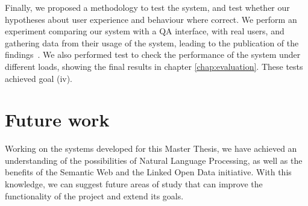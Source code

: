 Finally, we proposed a methodology to test the system, and test whether our hypotheses about user experience and behaviour where correct. We perform an experiment comparing our system with a \ac{QA} interface, with real users, and gathering data from their usage of the system, leading to the publication of the findings~\cite{Coro1509Personal}. We also performed test to check the performance of the system under different loads, showing the final results in chapter \ref{chap:evaluation}. These tests achieved goal (iv).

\section{Future work}

Working on the systems developed for this Master Thesis, we have achieved an understanding of the possibilities of Natural Language Processing, as well as the benefits of the Semantic Web and the Linked Open Data initiative. With this knowledge, we can suggest future areas of study that can improve the functionality of the project and extend its goals.

